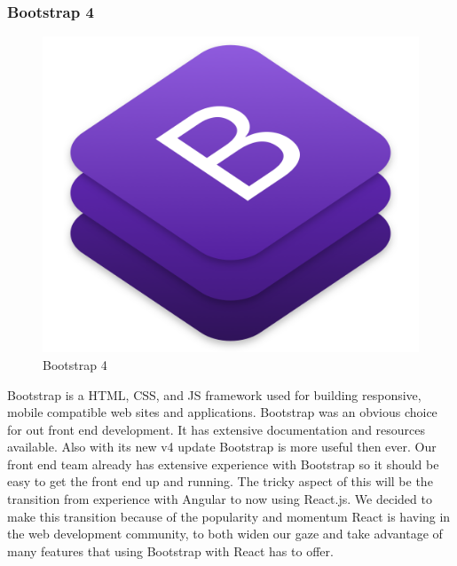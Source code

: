 \documentclass[12pt,a4paper]{report}
\begin{document}
			\subsubsection{Bootstrap 4}
			\begin{figure}
				\includegraphics[scale=0.15]{bootstrap4}
				\caption{Bootstrap 4}
				\label{fig: Bootstrap 4}
			\end{figure}
			Bootstrap is a HTML, CSS, and JS framework used for building responsive, mobile compatible web sites and applications. Bootstrap was an obvious choice for out front end development. It has extensive documentation and resources available. Also with its new v4 update Bootstrap is more useful then ever. Our front end team already has extensive experience with Bootstrap so it should be easy to get the front end up and running. The tricky aspect of this will be the transition from experience with Angular to now using React.js. We decided to make this transition because of the popularity and momentum React is having in the web development community, to both widen our gaze and take advantage of many features that using Bootstrap with React has to offer.
\end{document}
